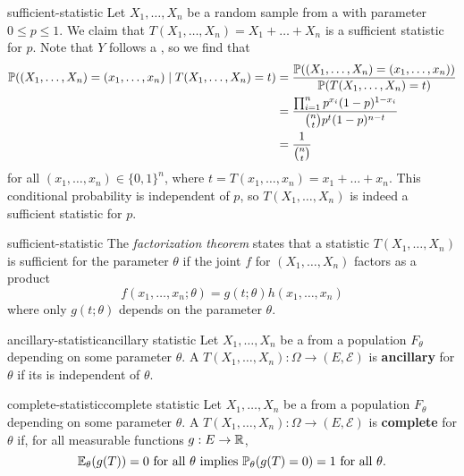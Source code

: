 \begin{example}{sufficient-statistic}
    Let $X_1, \ldots, X_n$ be a random sample from a  with parameter $0 \le p \le 1$. We claim that $T(X_1, \ldots, X_n) = X_1 + \ldots + X_n$ is a sufficient statistic for $p$. Note that $Y$ follows a , so we find that
    \[ \begin{aligned}
        \mathbb{P}((X_1, \ldots, X_n) = (x_1, \ldots, x_n) \mid T(X_1, \ldots, X_n) = t)
            &= \frac{\mathbb{P}((X_1, \ldots, X_n) = (x_1, \ldots, x_n))}{\mathbb{P}(T(X_1, \ldots, X_n) = t)} \\
            &= \frac{\prod_{i = 1}^{n} p^{x_i} (1 - p)^{1 - x_i}}{\binom{n}{t} p^t (1 - p)^{n - t}} \\
            &= \frac{1}{\binom{n}{t}}
    \end{aligned} \]
    for all $(x_1, \ldots, x_n) \in \{ 0, 1 \}^n$, where $t = T(x_1, \ldots, x_n) = x_1 + \ldots + x_n$. This conditional probability is independent of $p$, so $T(X_1, \ldots, X_n)$ is indeed a sufficient statistic for $p$.
\end{example}

\begin{example}{sufficient-statistic}
    The \textit{factorization theorem} states that a statistic $T(X_1, \ldots, X_n)$ is sufficient for the parameter $\theta$ if the joint  $f$ for $(X_1, \ldots, X_n)$ factors as a product
    \[ f(x_1, \ldots, x_n; \theta) = g(t; \theta) h(x_1, \ldots, x_n) \]
    where only $g(t; \theta)$ depends on the parameter $\theta$.
\end{example}

\begin{topic}{ancillary-statistic}{ancillary statistic}
    Let $X_1, \ldots, X_n$ be a  from a population $F_\theta$ depending on some parameter $\theta$. A  $T(X_1, \ldots, X_n) : \Omega \to (E, \mathcal{E})$ is \textbf{ancillary} for $\theta$ if its  is independent of $\theta$.
\end{topic}

\begin{topic}{complete-statistic}{complete statistic}
    Let $X_1, \ldots, X_n$ be a  from a population $F_\theta$ depending on some parameter $\theta$. A  $T(X_1, \ldots, X_n) : \Omega \to (E, \mathcal{E})$ is \textbf{complete} for $\theta$ if, for all measurable functions $g : E \to \mathbb{R}$,
    \[ \mathbb{E}_\theta(g(T)) = 0 \textup{ for all } \theta \textup{ implies } \mathbb{P}_\theta(g(T) = 0) = 1 \textup{ for all } \theta . \]
\end{topic}

